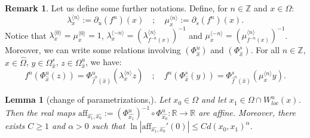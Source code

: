 \documentclass[a4paper]{article}
\newtheorem{lemma}[theorem]{Lemma}
\theoremstyle{definition}
\newtheorem{remark}[example]{Remark}
\begin{document}
\begin{remark}
Let us define some further notations. Define, for $n \in \mathbb{Z}$ and $x \in \Omega$:
$$ \lambda_x^{\langle n \rangle} := \partial_u (f^n)(x) \quad; \quad \mu_x^{\langle n \rangle} := \partial_s (f^n)(x)  .$$
Notice that $\lambda_x^{\langle 0 \rangle} = \mu_x^{\langle 0 \rangle} = 1$, $ \lambda_x^{\langle -n \rangle} = (\lambda_{f^{-n}(x)}^{\langle n \rangle})^{-1} $ and $\mu_x^{\langle -n \rangle} = (\mu_{f^{-n}(x)}^{\langle n \rangle})^{-1}$. 
Moreover, we can write some relations involving $(\Phi_{\widehat{x}}^u)$ and $(\Phi_{\widehat{x}}^s)$. For all $n \in \mathbb{Z}$, ${\widehat{x}} \in \widehat{\Omega}$, $y \in \Omega_{\widehat{x}}^s$, $z \in \Omega_{\widehat{x}}^u$, we have:
$$ f^n (\Phi_{\widehat{x}}^u(z)) = \Phi_{\widehat{f}^n({\widehat{x}})}^u(\lambda_x^{\langle n \rangle} z) \quad ; \quad f^n (\Phi_{\widehat{x}}^s(y)) = \Phi_{{\widehat{f}}^n({\widehat{x}})}^s(\mu_x^{\langle n \rangle} y) .$$
\end{remark}

\begin{lemma}[change of parametrizations,\cite{KK07}]\label{lem:aff}
Let $x_0 \in \Omega$ and let $x_1 \in \Omega \cap W_{loc}^u(x)$. Then the real maps $\text{aff}_{\widehat{x_1},\widehat{x_0}} := (\Phi_{\widehat{x_1}}^u)^{-1} \circ \Phi_{\widehat{x_0}}^u : \mathbb{R} \longrightarrow \mathbb{R}$ are affine.
Moreover, there exists $C \geq 1$ and $\alpha>0$ such that $\ln |{\text{aff}_{\widehat{x_1},\widehat{x_0}}}'(0)| \leq C d(x_0,x_1)^\alpha$.
\end{lemma}

\end{document}

